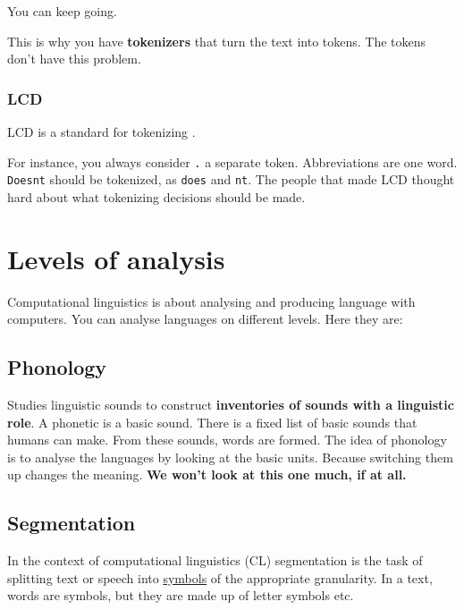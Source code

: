 \documentclass[
  11pt,
  british,
]{article}
\begin{document}
You can keep going.

This is why you have \textbf{tokenizers} that turn the text into tokens.
The tokens don't have this problem.

\hypertarget{lcd}{%
\subsubsection{LCD}\label{lcd}}

LCD is a standard for tokenizing .

For instance, you always consider \texttt{.} a separate token.
Abbreviations are one word. \texttt{Doesn\textquotesingle{}t} should be
tokenized, as \texttt{does} and \texttt{n\textquotesingle{}t}. The
people that made LCD thought hard about what tokenizing decisions should
be made.

\hypertarget{levels-of-analysis}{%
\section{Levels of analysis}\label{levels-of-analysis}}

Computational linguistics is about analysing and producing language with
computers. You can analyse languages on different levels. Here they are:

\hypertarget{phonology}{%
\subsection{Phonology}\label{phonology}}

Studies linguistic sounds to construct \textbf{inventories of sounds
with a linguistic role}. A phonetic is a basic sound. There is a fixed
list of basic sounds that humans can make. From these sounds, words are
formed. The idea of phonology is to analyse the languages by looking at
the basic units. Because switching them up changes the meaning.
\textbf{We won't look at this one much, if at all.}

\hypertarget{segmentation}{%
\subsection{Segmentation}\label{segmentation}}

In the context of computational linguistics (CL) segmentation is the
task of splitting text or speech into \href{Symbol.md}{symbols} of the
appropriate granularity. In a text, words are symbols, but they are made
up of letter symbols etc.
\end{document}
